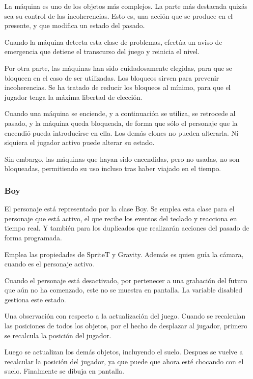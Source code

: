 \documentclass[11pt,a4paper]{article}
\begin{document}
La máquina es uno de los objetos más complejos. La parte más destacada quizás 
sea su control de las incoherencias. Esto es, una acción que se produce en el 
presente, y que modifica un estado del pasado.

Cuando la máquina detecta esta clase de problemas, efectúa un aviso de 
emergencia que detiene el transcurso del juego y reinicia el nivel.

Por otra parte, las máquinas han sido cuidadosamente elegidas, para que se 
bloqueen en el caso de ser utilizadas. Los bloqueos sirven para prevenir 
incoherencias. Se ha tratado de reducir los bloqueos al mínimo, para que el 
jugador tenga la máxima libertad de elección.

Cuando una máquina se enciende, y a continuación se utiliza, se retrocede al 
pasado, y la máquina queda bloqueada, de forma que sólo el personaje que la 
encendió pueda introducirse en ella. Los demás clones no pueden alterarla.  Ni 
siquiera el jugador activo puede alterar su estado.

Sin embargo, las máquinas que hayan sido encendidas, pero no usadas, no son 
bloqueadas, permitiendo su uso incluso tras haber viajado en el tiempo.

\subsubsection{Boy}

El personaje está representado por la clase Boy. Se emplea esta clase para el 
personaje que está activo, el que recibe los eventos del teclado y reacciona en 
tiempo real. Y también para los duplicados que realizarán acciones del pasado de 
forma programada.

Emplea las propiedades de SpriteT y Gravity. Además es quien guía la cámara, 
cuando es el personaje activo.

Cuando el personaje está desactivado, por pertenecer a una grabación del futuro 
que aún no ha comenzado, este no se muestra en pantalla. La variable disabled 
gestiona este estado.

Una observación con respecto a la actualización del juego. Cuando se recalculan 
las posiciones de todos los objetos, por el hecho de desplazar al jugador, 
primero se recalcula la posición del jugador.

Luego se actualizan los demás objetos, incluyendo el suelo. Despues se vuelve a 
recalcular la posición del jugador, ya que puede que ahora esté chocando con el 
suelo. Finalmente se dibuja en pantalla.
\end{document}
